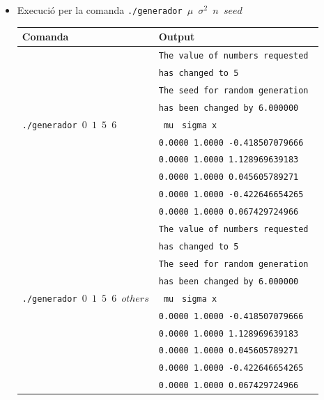 \documentclass[a4paper, 11pt]{article}
\begin{document}
    \begin{itemize}
    \item Execució per la comanda \texttt{./generador $\mu$ $\sigma^2$ $n$ $seed$}
        \begin{table}[h]
            \begin{center}
            \begin{tabular}{ l | l }
            \textbf{Comanda} & \textbf{Output}\\ \hline\hline
             \multirow{9}{*}{\texttt{./generador  $0$  $1$ $5$ $6$}} &\texttt{The value of numbers requested}\\
             & \texttt{has changed to 5} \\
             & \texttt{The seed for random generation }\\
             & \texttt{has been changed by 6.000000}\\
             &\hspace{1.5em}\texttt{    mu} \hspace{0.2em}\texttt{  sigma            }\hspace{5.9em}\texttt{x}\\ 
            & \texttt{0.0000 1.0000 -0.418507079666}\\
            & \texttt{0.0000 1.0000 1.128969639183}\\
            & \texttt{0.0000 1.0000 0.045605789271}\\
            & \texttt{0.0000 1.0000 -0.422646654265}\\
            & \texttt{0.0000 1.0000 0.067429724966}\\\hline
             \multirow{9}{*}{\texttt{./generador  $0$ $1$ $5$ $6$ $others$}} &\texttt{The value of numbers requested}\\
             & \texttt{has changed to 5} \\
             & \texttt{The seed for random generation }\\
             & \texttt{has been changed by 6.000000}\\
             & \hspace{1.5em}\texttt{    mu} \hspace{0.2em}\texttt{  sigma            }\hspace{5.9em}\texttt{x}\\ 
            & \texttt{0.0000 1.0000 -0.418507079666}\\
            & \texttt{0.0000 1.0000 1.128969639183}\\
            & \texttt{0.0000 1.0000 0.045605789271}\\
            & \texttt{0.0000 1.0000 -0.422646654265}\\
            & \texttt{0.0000 1.0000 0.067429724966}\\
            \end{tabular}
            \end{center}\label{taula1}
    \end{table}
    \end{itemize}
\end{document}
